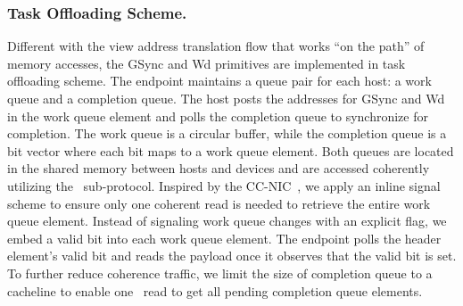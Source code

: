 
\subsubsection{Task Offloading Scheme. }

Different with the view address translation flow that works ``on the path'' of memory accesses, the GSync and Wd primitives are implemented in task offloading scheme. 
The endpoint maintains a queue pair for each host: a work queue and a completion queue. The host posts the addresses for GSync and Wd in the work queue element and polls the completion queue to synchronize for completion. The work queue is a circular buffer, while the completion queue is a bit vector where each bit maps to a work queue element.  
Both queues are located in the shared memory between hosts and devices and are accessed coherently utilizing the \cxlcache~sub-protocol. 
Inspired by the CC-NIC~\cite{ccnic_asplos24}, we apply an inline signal scheme to ensure only one coherent read is needed to retrieve the entire work queue element. Instead of signaling work queue changes with an explicit flag, we embed a valid bit into each work queue element. The endpoint polls the header element's valid bit and reads the payload once it observes that the valid bit is set. To further reduce coherence traffic, we limit the size of completion queue to a cacheline to enable one \cxlcache~read to get all pending completion queue elements. 

% 

% 



